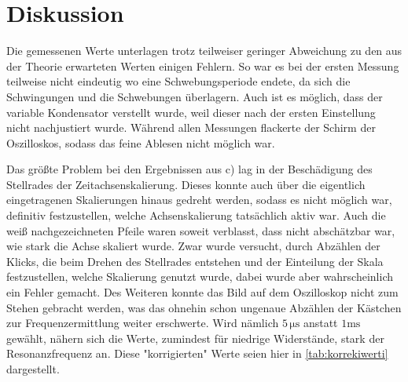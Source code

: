 \section{Diskussion}
\label{sec:Diskussion}

Die gemessenen Werte unterlagen trotz teilweiser geringer Abweichung zu den aus der Theorie erwarteten Werten einigen Fehlern.
So war es bei der ersten Messung teilweise nicht eindeutig wo eine Schwebungsperiode endete, da sich die Schwingungen und die Schwebungen überlagern.
Auch ist es möglich, dass der variable Kondensator verstellt wurde, weil dieser nach der ersten Einstellung nicht nachjustiert wurde.
Während allen Messungen flackerte der Schirm der Oszilloskos, sodass das feine Ablesen nicht möglich war.



Das größte Problem bei den Ergebnissen aus c) lag in der Beschädigung des Stellrades der Zeitachsenskalierung. Dieses konnte auch über die eigentlich eingetragenen Skalierungen hinaus gedreht werden, sodass es nicht
möglich war, definitiv festzustellen, welche Achsenskalierung tatsächlich aktiv war. Auch die weiß nachgezeichneten Pfeile waren soweit verblasst, dass nicht abschätzbar war, wie stark die Achse skaliert wurde. Zwar
wurde versucht, durch Abzählen der Klicks, die beim Drehen des Stellrades entstehen und der Einteilung der Skala festzustellen, welche Skalierung genutzt wurde, dabei wurde aber wahrscheinlich ein Fehler gemacht.
Des Weiteren konnte das Bild auf dem Oszilloskop nicht zum Stehen gebracht werden, was das ohnehin schon ungenaue Abzählen der Kästchen zur Frequenzermittlung weiter erschwerte.
Wird nämlich $5 \, \unit{\micro\second}$ anstatt $1 \unit{\milli\second}$ gewählt, nähern sich die Werte, zumindest für niedrige Widerstände, stark der Resonanzfrequenz an.
Diese "korrigierten" Werte seien hier in \autoref{tab:korrekiwerti} dargestellt.

